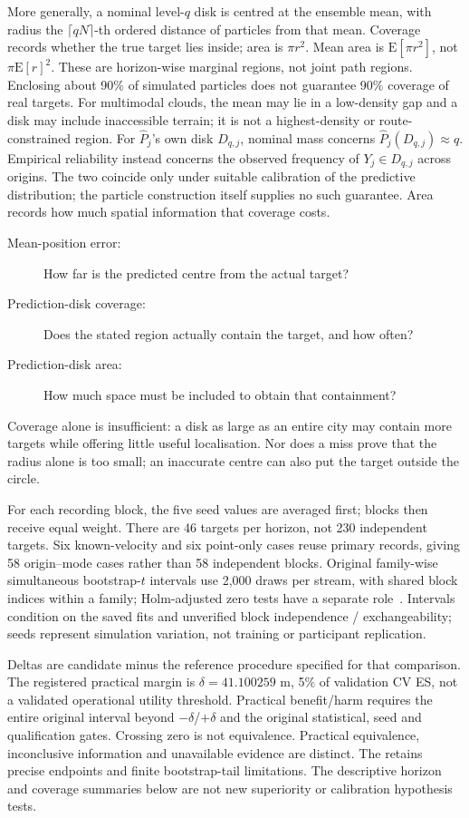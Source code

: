 More generally, a nominal level-$q$ disk is centred at the ensemble mean, with radius the
$\lceil qN\rceil$-th ordered distance of particles from that mean. Coverage
records whether the true target lies inside; area is $\pi r^2$.
Mean area is $\mathrm E[\pi r^2]$, not $\pi\mathrm E[r]^2$. These are
horizon-wise marginal regions, not joint path regions. Enclosing about
90\% of simulated particles does not guarantee 90\% coverage of real targets.
For multimodal clouds, the mean may lie in a low-density gap and a disk may
include inaccessible terrain; it is not a highest-density or route-constrained
region.
For $\widehat P_j$'s own disk $D_{q,j}$, nominal mass concerns
$\widehat P_j(D_{q,j})\approx q$. Empirical reliability instead concerns
the observed frequency of $Y_j\in D_{q,j}$ across origins. The two coincide
only under suitable calibration of the predictive distribution; the
particle construction itself supplies no such guarantee. Area records
how much spatial information that coverage costs.
\begin{description}
\item[Mean-position error:] How far is the predicted centre from the actual target?
\item[Prediction-disk coverage:] Does the stated region actually contain the target, and how often?
\item[Prediction-disk area:] How much space must be included to obtain that containment?
\end{description}
Coverage alone is insufficient: a disk as large as an entire city may
contain more targets while offering little useful localisation. Nor does
a miss prove that the radius alone is too small; an inaccurate centre
can also put the target outside the circle.

For each recording block, the five seed values are averaged first; blocks
then receive equal weight. There are 46 targets per horizon, not 230
independent targets. Six known-velocity and six point-only cases reuse
primary records, giving 58 origin--mode cases rather than 58 independent
blocks. Original family-wise simultaneous bootstrap-$t$ intervals use
2,000 draws per stream, with shared block indices within a family;
Holm-adjusted zero tests have a separate role~\cite{holm1979,davison1997}.
Intervals condition on the saved fits and unverified block independence /
exchangeability; seeds represent simulation variation, not training or
participant replication.

Deltas are candidate minus the reference procedure specified for that comparison. The registered practical margin
is $\delta=41.100259$ m, 5\% of validation CV ES, not a validated
operational utility threshold. Practical benefit/harm requires the entire
original interval beyond $-\delta$/$+\delta$ and the original statistical,
seed and qualification gates. Crossing zero is not equivalence. Practical
equivalence, inconclusive information and unavailable evidence are distinct.
The  retains precise endpoints and finite
bootstrap-tail limitations. The descriptive horizon and coverage summaries
below are not new superiority or calibration hypothesis tests.

